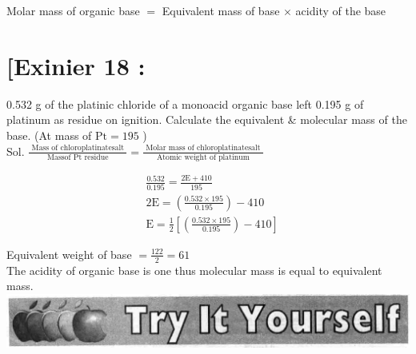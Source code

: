\documentclass[10pt]{article}
\begin{document}
Molar mass of organic base $=$ Equivalent mass of base $\times$ acidity of the base

\section*{[Exinier 18 :}
0.532 g of the platinic chloride of a monoacid organic base left 0.195 g of platinum as residue on ignition. Calculate the equivalent \& molecular mass of the base. (At mass of $\mathrm{Pt}=195$ )\\
Sol. $\frac{\text { Mass of chloroplatinatesalt }}{\text { Massof } \mathrm{Pt} \text { residue }}=\frac{\text { Molar mass of chloroplatinatesalt }}{\text { Atomic weight of platinum }}$

$$
\begin{aligned}
& \frac{0.532}{0.195}=\frac{2 \mathrm{E}+410}{195} \\
& 2 \mathrm{E}=\left(\frac{0.532 \times 195}{0.195}\right)-410 \\
& \mathrm{E}=\frac{1}{2}\left[\left(\frac{0.532 \times 195}{0.195}\right)-410\right]
\end{aligned}
$$

Equivalent weight of base $=\frac{122}{2}=61$\\
The acidity of organic base is one thus molecular mass is equal to equivalent mass.\\
\includegraphics[max width=\textwidth, center]{2025_01_28_8470952b98110cec3aabg-112}
\end{document}
